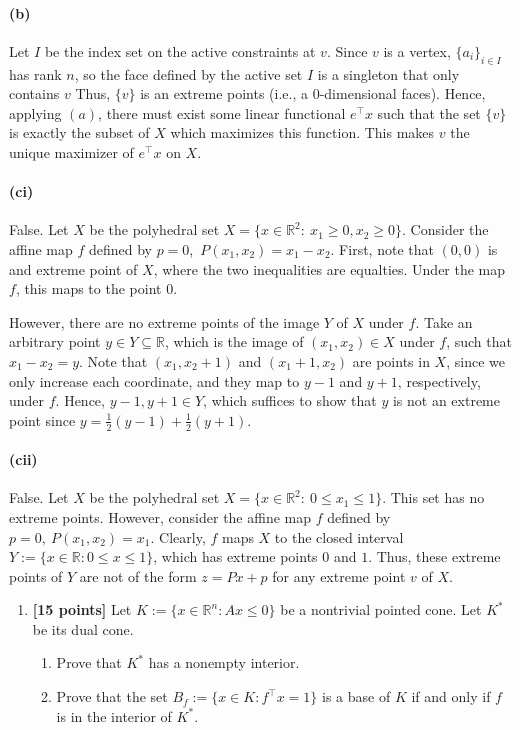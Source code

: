 \documentclass[11pt,letterpaper]{article}
\theoremstyle{definition}
\newcommand{\reals}{\mathbb{R}}
\begin{document}
\paragraph{(b)}
Let $I$ be the index set on the active constraints at $v$.
Since $v$ is a vertex, $\{a_i\}_{i\in I}$ has rank $n$, so the face defined by the active set $I$ is a singleton that only contains $v$
Thus, $\{v\}$ is an extreme points (i.e., a 0-dimensional faces).
Hence, applying $(a)$, there must exist some linear functional $e^\top x$ such that the set $\{v\}$ is exactly the subset of $X$ which maximizes this function.
This makes $v$ the unique maximizer of $e^\top x$ on $X$.

\paragraph{(ci)}
False. Let $X$ be the polyhedral set $X=\{x\in \reals^2:\ x_1\geq 0, x_2\geq 0\}$.
Consider the affine map $f$ defined by $p=0$,\ $P(x_1,x_2) = x_1-x_2$. 
First, note that $(0,0)$ is and extreme point of $X$, where the two inequalities are equalties. 
Under the map $f$, this maps to the point $0$.

However, there are no extreme points of the image $Y$ of $X$ under $f$. 
Take an arbitrary point $y\in Y\subseteq \reals$, which is the image of $(x_1,x_2)\in X$ under $f$, such that $x_1-x_2 = y$. 
Note that $(x_1,x_2+1)$ and $(x_1+1,x_2)$ are points in $X$, since we only increase each coordinate, and they map to $y-1$ and $y+1$, respectively, under $f$.
Hence, $y-1, y+1\in Y$, which suffices to show that $y$ is not an extreme point since $y = \frac{1}{2}(y-1) + \frac{1}{2}(y+1)$.

\paragraph{(cii)}
False. Let $X$ be the polyhedral set $X = \{x\in \reals^2:\ 0\le x_1\le 1\}$. 
This set has no extreme points.
However, consider the affine map $f$ defined by $p=0,\ P(x_1,x_2) = x_1$.
Clearly, $f$ maps $X$ to the closed interval $Y:=\{x\in \reals: 0\le x \le 1\} $, which has extreme points $0$ and $1$.
Thus, these extreme points of $Y$ are not of the form $z=Px+p$ for any extreme point $v$ of $X$.

\begin{enumerate}[resume=q]
\item \textbf{[15 points]} Let $K := \{x \in \reals^n : Ax \leq 0\}$ be a nontrivial pointed cone. Let $K^*$ be its dual cone.
\begin{enumerate}
\item Prove that $K^*$ has a nonempty interior.
\item Prove that the set $B_f := \{x \in K : f^\top x = 1\}$ is a base of $K$ if and only if $f$ is in the interior of $K^*$.
\end{enumerate}
\end{enumerate}
\end{document}
